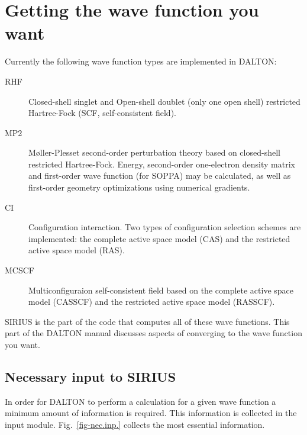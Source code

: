 \chapter{\label{chap:wf-guide}Getting the wave function you want}
 
Currently the following wave function types are implemented in DALTON:

\begin{description}

\item[RHF] Closed-shell singlet and Open-shell doublet (only one open shell)
restricted Hartree-Fock (SCF, self-consistent
field). 

\item[MP2] M{\o}ller-Plesset second-order perturbation
theory based on
closed-shell restricted Hartree-Fock.  Energy, second-order one-electron
density matrix and first-order wave function (for SOPPA) may be
calculated, as well as first-order geometry optimizations using
numerical gradients.

\item[CI] Configuration interaction. Two types of configuration selection 
schemes are implemented: the complete active space model (CAS) and the
restricted active space model (RAS).

\item[MCSCF] Multiconfiguraion self-consistent field based on
the complete active space model (CASSCF) and
the restricted active space model
(RASSCF).

\end{description}

SIRIUS is the part of the code that computes all of these
wave functions. 
This part of the DALTON manual discusses aspects of converging to the
wave function you want.

\section{\label{sec:ig_necinp} Necessary input to SIRIUS}
 
In order for DALTON to perform a calculation for a given wave function a
minimum amount of  
information is required. This information is collected in the
 input module. Fig.~\ref{fig-nec.inp.} collects the most
essential information.
 

